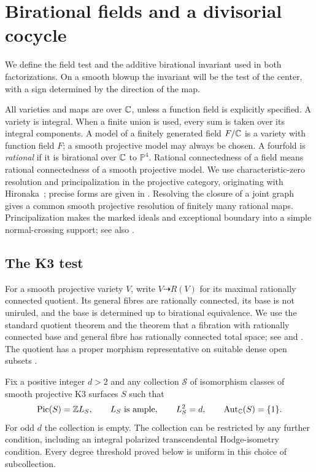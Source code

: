 \section{Birational fields and a divisorial cocycle}
\label{pre:section}

We define the field test and the additive birational invariant used in
both factorizations. On a smooth blowup the invariant will be the test
of the center, with a sign determined by the direction of the map.

All varieties and maps are over $\mathbb C$, unless a function field is explicitly
specified. A variety is integral. When a finite union is used, every sum is
taken over its integral components. A model of a finitely generated field
$F/\mathbb C$ is a variety with function field $F$; a smooth projective model may
always be chosen. A fourfold is \emph{rational} if it is birational over $\mathbb C$
to $\mathbb P^4$. Rational connectedness of a field means rational
connectedness of a smooth projective model.
We use characteristic-zero resolution and principalization in the
projective category, originating with Hironaka~\cite{Hironaka64}; precise
forms are given in \cite[Theorems~1.0.1--1.0.3]{Wlodarczyk05}.
Resolving the closure of a joint graph gives a common smooth projective
resolution of finitely many rational maps. Principalization makes the
marked ideals and exceptional boundary into a simple normal-crossing
support; see also \cite[Sections~1.2.2--1.2.3]{AKMW02}.

\subsection{The K3 test}

For a smooth projective variety $V$, write
$V\dashrightarrow R(V)$ for its maximal rationally connected quotient.
Its general fibres are rationally connected, its base is not uniruled,
and the base is determined up to birational equivalence. We use the
standard quotient theorem and the theorem that a fibration with
rationally connected base and general fibre has rationally connected
total space; see \cite[Chapter~IV, \S5]{Kollar96} and
\cite[Corollaries~1.3--1.4]{GHS03}.
The quotient has a proper morphism representative on suitable dense open
subsets \cite[\S0.7 and Theorem~2.3]{Campana92}.

Fix a positive integer $d>2$ and any collection $\mathcal S$ of
isomorphism classes of smooth projective K3 surfaces $S$ such that
\begin{equation}\label{pre:test-collection}
 \operatorname{Pic}(S)=\mathbb Z L_S,\qquad L_S\text{ is ample},\qquad
 L_S^2=d,\qquad \operatorname{Aut}_{\mathbb C}(S)=\{1\}.
\end{equation}
For odd $d$ the collection is empty. The collection can be restricted
by any further condition, including
an integral polarized transcendental Hodge-isometry condition. Every
degree threshold proved below is uniform in this choice of subcollection.

